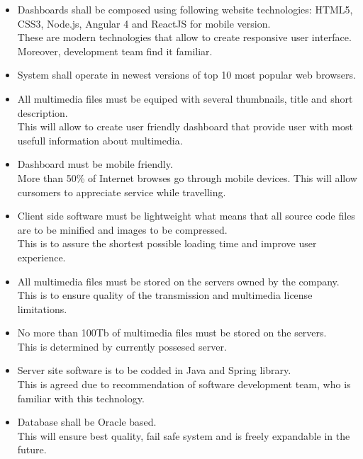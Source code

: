 \documentclass{scrreprt}
\begin{document}
\begin{itemize}
\item Dashboards shall be composed using following website technologies: HTML5, CSS3, Node.js, Angular 4 and ReactJS for mobile version.
\\These are modern technologies that allow to create responsive user interface. Moreover, development team find it familiar.

\item System shall operate in newest versions of top 10 most popular web browsers.

\item All multimedia files must be equiped with several thumbnails, title and short description.
\\This will allow to create user friendly dashboard that provide user with most usefull information about multimedia.

\item Dashboard must be mobile friendly.
\\More than 50\% of Internet browses go through mobile devices. This will allow cursomers to appreciate service while travelling.

\item Client side software must be lightweight what means that all source code files are to be minified and images to be compressed.
\\This is to assure the shortest possible loading time and improve user experience.

\item All multimedia files must be stored on the servers owned by the company.
\\This is to ensure quality of the transmission and multimedia license limitations.

\item No more than 100Tb of multimedia files must be stored on the servers.
\\This is determined by currently possesed server.

\item Server site software is to be codded in Java and Spring library.
\\This is agreed due to recommendation of software development team, who is familiar with this technology.

\item Database shall be Oracle based.
\\This will ensure best quality, fail safe system and is freely expandable in the future.


\end{itemize}
\end{document}
